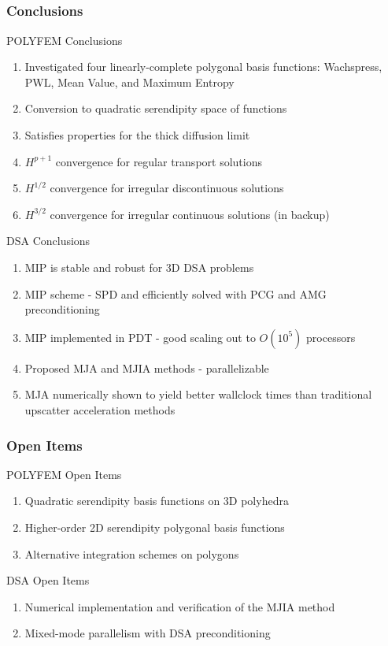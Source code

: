 \documentclass[compress,10pt]{beamer}
\begin{document}
\subsection{}
\begin{frame}[t]\frametitle{Conclusions}
{
\begin{block}{POLYFEM Conclusions}
\begin{enumerate}
\item Investigated four linearly-complete polygonal basis functions: Wachspress, PWL, Mean Value, and Maximum Entropy
\item Conversion to quadratic serendipity space of functions
\item Satisfies properties for the thick diffusion limit
\item $H^{p+1}$ convergence for regular transport solutions
\item $H^{1/2}$ convergence for irregular discontinuous solutions
\item $H^{3/2}$ convergence for irregular continuous solutions (in backup)
\end{enumerate}
\end{block}
}
{
\begin{block}{DSA Conclusions}
\begin{enumerate}
\item MIP is stable and robust for 3D DSA problems
\item MIP scheme - SPD and efficiently solved with PCG and AMG preconditioning
\item MIP implemented in PDT - good scaling out to $O(10^5)$ processors
\item Proposed MJA and MJIA methods - parallelizable
\item MJA numerically shown to yield better wallclock times than traditional upscatter acceleration methods
\end{enumerate}
\end{block}
}
\end{frame}
\begin{frame}[t]\frametitle{Open Items}
\begin{block}{POLYFEM Open Items}
\begin{enumerate}
\item Quadratic serendipity basis functions on 3D polyhedra
\item Higher-order 2D serendipity polygonal basis functions
\item Alternative integration schemes on polygons
\end{enumerate}
\end{block}
\begin{block}{DSA Open Items}
\begin{enumerate}
\item Numerical implementation and verification of the MJIA method
\item Mixed-mode parallelism with DSA preconditioning
\end{enumerate}
\end{block}
\end{frame}
\end{document}
